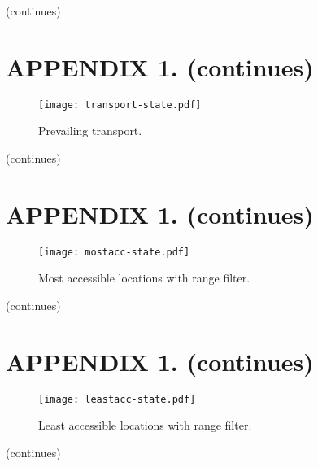 \vfill
\begin{flushright}
  (continues)
\end{flushright}

\thispagestyle{empty}
\section*{APPENDIX 1. (continues)}

\vfill

\begin{figure}[ht]
  \centering
  \captionsetup{justification=centering,margin=0.2cm}
  \texttt{[image: transport-state.pdf]}
  \caption{Prevailing transport.}
  \label{pic:transportstate}
\end{figure}

\vfill
\begin{flushright}
  (continues)
\end{flushright}

\thispagestyle{empty}
\section*{APPENDIX 1. (continues)}

\vfill

\begin{figure}[ht]
  \centering
  \captionsetup{justification=centering,margin=0.2cm}
  \texttt{[image: mostacc-state.pdf]}
  \caption{Most accessible locations with range filter.}
  \label{pic:mostaccstate}
\end{figure}

\vfill
\begin{flushright}
  (continues)
\end{flushright}

\thispagestyle{empty}
\section*{APPENDIX 1. (continues)}

\vfill

\begin{figure}[ht]
  \centering
  \captionsetup{justification=centering,margin=0.2cm}
  \texttt{[image: leastacc-state.pdf]}
  \caption{Least accessible locations with range filter.}
  \label{pic:leastaccstate}
\end{figure}

\vfill
\begin{flushright}
  (continues)
\end{flushright}

